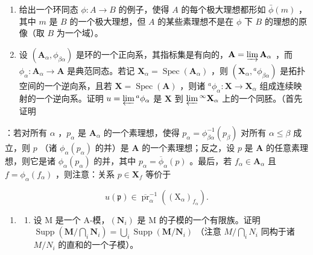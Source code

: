 \begin{enumerate}
\def\labelenumi{\arabic{enumi}.}
\setcounter{enumi}{19}
\item
  给出一个环同态 \(\phi: A \to B\) 的例子，使得 \(A\) 的每个极大理想都形如 \(\bar{\phi}(m)\) ，其中 \(m\) 是 \(B\) 的一个极大理想，但 \(A\) 的某些素理想不是在 \(\phi\) 下 \(B\) 的理想的原像（取 \(B\) 为一个域）。
\item
  设 \((\mathbf{A}_{\alpha}, \phi_{\beta \alpha})\) 是环的一个正向系，其指标集是有向的，\(\mathbf{A} = \varinjlim \mathbf{A}_{\alpha}\) ，而 \(\phi_{\alpha}: \mathbf{A}_{\alpha} \to \mathbf{A}\) 是典范同态。若记 \(\mathbf{X}_{\alpha} = \operatorname{Spec}(\mathbf{A}_{\alpha})\) ，则 \((\mathbf{X}_{\alpha}, {}^{a}\phi_{\beta \alpha})\) 是拓扑空间的一个逆向系，且若 \(\mathbf{X} = \operatorname{Spec}(\mathbf{A})\) ，则诸 \({}^{a}\phi_{\alpha}: \mathbf{X} \to \mathbf{X}_{\alpha}\) 组成连续映射的一个逆向系。证明 \(u = \varprojlim {}^{a}\phi_{\alpha}\) 是 \(\mathbf{X}\) 到 \(\varprojlim {}^{\infty}\mathbf{X}_{\alpha}\) 上的一个同胚。（首先证明
\end{enumerate}

：若对所有 \(\alpha\) ，\(p_{\alpha}\) 是 \(\mathbf{A}_{\alpha}\) 的一个素理想，使得 \(p_{\alpha} = \phi_{\beta \alpha}^{-1}(p_{\beta})\) 对所有 \(\alpha \leqslant \beta\) 成立，则 \(p\) （诸 \(\phi_{\alpha}(p_{\alpha})\) 的并）是 \(\mathbf{A}\) 的一个素理想；反之，设 \(p\) 是 \(\mathbf{A}\) 的任意素理想，则它是诸 \(\phi_{\alpha}(p_{\alpha})\) 的并，其中 \(p_{\alpha} = \overline{\phi}_{\alpha}(p)\) 。最后，若 \(f_{\alpha} \in \mathbf{A}_{\alpha}\) 且 \(f = \phi_{\alpha}(f_{\alpha})\) ，则注意：关系 \(p \in \mathbf{X}_f\) 等价于

\[
u (\mathfrak {p}) \in \overline {{\operatorname{pr}}} _ {\alpha} ^ {- 1} ((\mathrm{X} _ {\alpha}) _ {f _ {\alpha}}).
\]

\begin{enumerate}
\def\labelenumi{\arabic{enumi}.}
\setcounter{enumi}{21}
\tightlist
\item
  \begin{enumerate}
  \def\labelenumii{(\alph{enumii})}
  \tightlist
  \item
    设 M 是一个 A-模，\((\mathbf{N}_{i})\) 是 M 的子模的一个有限族。证明 \(\operatorname{Supp}\left(\mathbf{M}/\bigcap_{i}\mathbf{N}_{i}\right)=\bigcup_{i}\operatorname{Supp}(\mathbf{M}/\mathbf{N}_{i})\) （注意 \(M/\bigcap_{i}N_{i}\) 同构于诸 \(M/N_{i}\) 的直和的一个子模）。
  \end{enumerate}
\end{enumerate}

